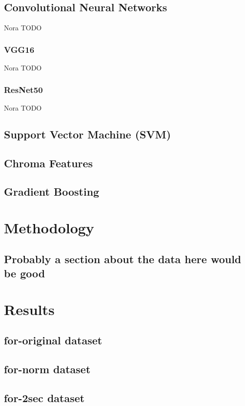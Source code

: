 \documentclass[sigconf,authordraft]{acmart}
\begin{document}
\subsection{Convolutional Neural Networks}
Nora TODO
\subsubsection{VGG16}
Nora TODO
\subsubsection{ResNet50}
Nora TODO

\subsection{Support Vector Machine (SVM)}

\subsection{Chroma Features}

\subsection{Gradient Boosting}

\section{Methodology}

\subsection{Probably a section about the data here would be good}

\section{Results}

\subsection{for-original dataset}

\subsection{for-norm dataset}

\subsection{for-2sec dataset}
\end{document}
